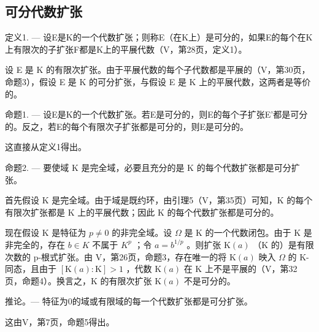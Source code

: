 \subsection{可分代数扩张}

定义1. --- 设E是K的一个代数扩张；则称E（在K上）是可分的，如果E的每个在K上有限次的子扩张F都是K上的平展代数（V，第28页，定义1）。

设 E 是 K 的有限次扩张。由于平展代数的每个子代数都是平展的（V，第30页，命题3），假设 E 是 K 的可分扩张，与假设 E 是 K 上的平展代数，这两者是等价的。

命题1. --- 设E是K的一个代数扩张。若E是可分的，则E的每个子扩张E'都是可分的。反之，若E的每个有限次子扩张都是可分的，则E是可分的。

这直接从定义1得出。

命题2. --- 要使域 K 是完全域，必要且充分的是 K 的每个代数扩张都是可分扩张。

首先假设 K 是完全域。由于域是既约环，由引理5（V，第35页）可知，K 的每个有限次扩张都是 K 上的平展代数；因此 K 的每个代数扩张都是可分的。

现在假设 K 是特征为 \(p \neq 0\) 的非完全域。设 \(\Omega\) 是 K 的一个代数闭包。由于 K 是非完全的，存在 \(b \in K\) 不属于 \(K^{p}\) ；令 \(a = b^{1/p}\) 。则扩张 \(\mathrm{K}(a)\) （K 的）是有限次数的 p-根式扩张。由 V，第26页，命题3，存在唯一的将 \(\mathrm{K}(a)\) 映入 \(\Omega\) 的 K-同态，且由于 \([\mathrm{K}(a):\mathrm{K}] > 1\) ，代数 \(\mathrm{K}(a)\) 在 K 上不是平展的（V，第32页，命题4）。换言之，K 的有限次扩张 \(\mathrm{K}(a)\) 不是可分的。

推论。--- 特征为0的域或有限域的每一个代数扩张都是可分扩张。

这由V，第7页，命题5得出。

